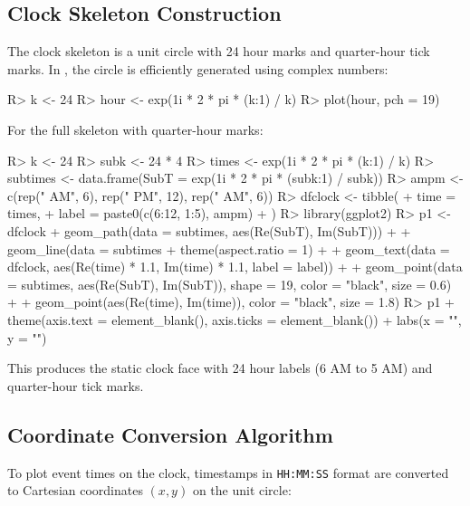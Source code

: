 \documentclass[article]{jss}
\begin{document}
\subsection{Clock Skeleton Construction}

The clock skeleton is a unit circle with 24 hour marks and quarter-hour tick marks. In , the circle is efficiently generated using complex numbers:

\begin{Schunk}
\begin{Sinput}
R> k <- 24
R> hour <- exp(1i * 2 * pi * (k:1) / k)
R> plot(hour, pch = 19)
\end{Sinput}
\end{Schunk}

For the full skeleton with quarter-hour marks:

\begin{Schunk}
\begin{Sinput}
R> k <- 24
R> subk <- 24 * 4
R> times <- exp(1i * 2 * pi * (k:1) / k)
R> subtimes <- data.frame(SubT = exp(1i * 2 * pi * (subk:1) / subk))
R> ampm <- c(rep(" AM", 6), rep(" PM", 12), rep(" AM", 6))
R> dfclock <- tibble(
+    time = times,
+    label = paste0(c(6:12, 1:5), ampm)
+  )
R> library(ggplot2)
R> p1 <- dfclock %
+    geom_path(data = subtimes, aes(Re(SubT), Im(SubT))) +
+    geom_line(data = subtimes %
+    theme(aspect.ratio = 1) +
+    geom_text(data = dfclock, aes(Re(time) * 1.1, Im(time) * 1.1, label = label)) +
+    geom_point(data = subtimes, aes(Re(SubT), Im(SubT)), shape = 19, color = "black", size = 0.6) +
+    geom_point(aes(Re(time), Im(time)), color = "black", size = 1.8)
R> p1 + theme(axis.text = element_blank(), axis.ticks = element_blank()) + labs(x = "", y = "")
\end{Sinput}
\end{Schunk}

This produces the static clock face with 24 hour labels (6 AM to 5 AM) and quarter-hour tick marks.

\subsection{Coordinate Conversion Algorithm}

To plot event times on the clock, timestamps in \texttt{HH:MM:SS} format are converted to Cartesian coordinates $(x, y)$ on the unit circle:
\end{document}
